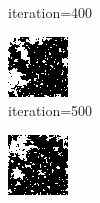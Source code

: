 \documentclass{article}
\begin{document}
\begin{figure}[h]
\begin{subfigure}[t]{0.18\textwidth}
\vspace{-0.6cm}
\caption{iteration=400}
\end{subfigure}\hspace{0.01\textwidth}
\begin{subfigure}[t]{0.18\textwidth}
\centering
\includegraphics[width=\textwidth]{./computational/results/gibbs_node_sampler_negative_iter_500.png}
\vspace{-0.6cm}
\caption{iteration=500}
\end{subfigure}\hspace{0.01\textwidth}
\begin{subfigure}[t]{0.18\textwidth}
\centering
\includegraphics[width=\textwidth]{./computational/results/gibbs_node_sampler_negative_iter_600.png}

\end{subfigure}
\end{figure}
\end{document}
